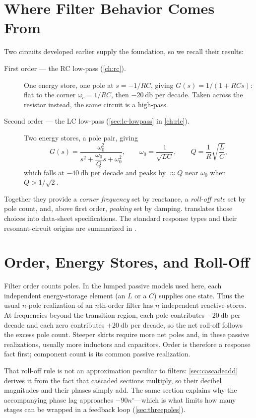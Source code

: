 \section{Where Filter Behavior Comes From}
Two circuits developed earlier supply the foundation, so we recall their results:
\begin{description}
\item[First order --- the RC low-pass (\cref{ch:rc}).] One energy store, one pole
at \(s=-1/RC\), giving \(G(s)=1/(1+RCs)\): flat to the corner
\(\omega_c=1/RC\), then \(-\SI{20}{\decibel}\) per decade. Taken across the
resistor instead, the same circuit is a high-pass.
\item[Second order --- the LC low-pass (\cref{sec:lc-lowpass} in
\cref{ch:rlc}).] Two energy stores, a pole pair, giving
\[
G(s)=\frac{\omega_0^2}{s^2+\dfrac{\omega_0}{Q}s+\omega_0^2},
\qquad
\omega_0=\frac{1}{\sqrt{LC}},
\qquad
Q=\frac{1}{R}\sqrt{\frac{L}{C}},
\]
which falls at \(-\SI{40}{\decibel}\) per decade and peaks by \(\approx Q\) near
\(\omega_0\) when \(Q>1/\sqrt2\).
\end{description}
Together they provide a \emph{corner frequency} set by reactance, a
\emph{roll-off rate} set by pole count, and, above first order, \emph{peaking}
set by damping.  translates those choices into data-sheet
specifications.
The standard response types and their resonant-circuit origins are summarized in
\cite[pp.~37--45]{bowick2008rfcircuit}.

\section{Order, Energy Stores, and Roll-Off}
Filter order counts poles. In the lumped passive models used here, each independent
energy-storage element (an \(L\) or a \(C\)) supplies one state. Thus the usual
\(n\)-pole realization of an \(n\)th-order filter has \(n\) independent reactive
stores. At frequencies beyond the transition region, each pole contributes
\(-\SI{20}{\decibel}\) per decade and each zero contributes \(+\SI{20}{\decibel}\)
per decade, so the net roll-off follows the excess pole count. Steeper skirts
require more net poles and, in these passive realizations, usually more inductors and
capacitors. Order is therefore a response fact first; component count is its common
passive realization.

That roll-off rule is not an approximation peculiar to filters:
\cref{sec:cascadeadd} derives it from the fact that cascaded sections multiply,
so their decibel magnitudes and their phases simply add. The same section explains
why the accompanying phase lag approaches \(-90n^\circ\)---which is what limits how
many stages can be wrapped in a feedback loop (\cref{sec:threepoles}).

